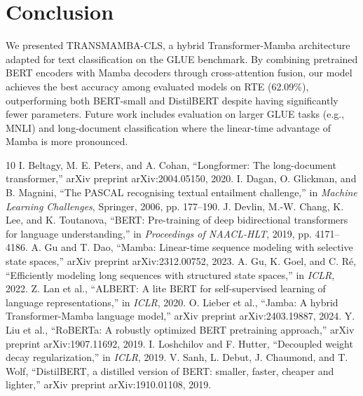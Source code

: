 \documentclass[10pt, conference]{IEEEtran}
\begin{document}
\section{Conclusion} %
We presented TRANSMAMBA-CLS, a hybrid Transformer-Mamba architecture adapted for text classification on the GLUE benchmark. %
By combining pretrained BERT encoders with Mamba decoders through cross-attention fusion, our model achieves the best accuracy among evaluated models on RTE (62.09\%), outperforming both BERT-small and DistilBERT despite having significantly fewer parameters. %
Future work includes evaluation on larger GLUE tasks (e.g., MNLI) and long-document classification where the linear-time advantage of Mamba is more pronounced. %

\begin{thebibliography}{10}
 I. Beltagy, M. E. Peters, and A. Cohan, ``Longformer: The long-document transformer,'' arXiv preprint arXiv:2004.05150, 2020. %
 I. Dagan, O. Glickman, and B. Magnini, ``The PASCAL recognising textual entailment challenge,'' in \textit{Machine Learning Challenges}, Springer, 2006, pp. 177--190. %
 J. Devlin, M.-W. Chang, K. Lee, and K. Toutanova, ``BERT: Pre-training of deep bidirectional transformers for language understanding,'' in \textit{Proceedings of NAACL-HLT}, 2019, pp. 4171--4186. %
 A. Gu and T. Dao, ``Mamba: Linear-time sequence modeling with selective state spaces,'' arXiv preprint arXiv:2312.00752, 2023. %
 A. Gu, K. Goel, and C. Ré, ``Efficiently modeling long sequences with structured state spaces,'' in \textit{ICLR}, 2022. %
 Z. Lan et al., ``ALBERT: A lite BERT for self-supervised learning of language representations,'' in \textit{ICLR}, 2020. %
 O. Lieber et al., ``Jamba: A hybrid Transformer-Mamba language model,'' arXiv preprint arXiv:2403.19887, 2024. %
 Y. Liu et al., ``RoBERTa: A robustly optimized BERT pretraining approach,'' arXiv preprint arXiv:1907.11692, 2019. %
 I. Loshchilov and F. Hutter, ``Decoupled weight decay regularization,'' in \textit{ICLR}, 2019. %
 V. Sanh, L. Debut, J. Chaumond, and T. Wolf, ``DistilBERT, a distilled version of BERT: smaller, faster, cheaper and lighter,'' arXiv preprint arXiv:1910.01108, 2019. %

\end{thebibliography}
\end{document}
